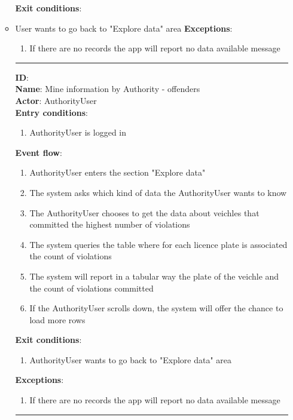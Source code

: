 \begin{enumerate}
\begin{itemize}
		\textbf{Exit conditions}:
          \item{User wants to go back to "Explore data" area}
		\textbf{Exceptions}:
    \begin{enumerate}
      \item{If there are no records the app will report no data available message}
    \end{enumerate}
		\rule{\linewidth}{0.4pt}
		\textbf{ID}:  \\
		\textbf{Name}: Mine information by Authority - offenders \\
		\textbf{Actor}: AuthorityUser   \\
		\textbf{Entry conditions}:
		\begin{enumerate}
			\item{AuthorityUser is logged in}
		\end{enumerate}
		\textbf{Event flow}:
		\begin{enumerate}
			\item{AuthorityUser enters the section "Explore data"}
			\item{The system asks which kind of data the AuthorityUser wants to know}
      \item{The AuthorityUser chooses to get the data about veichles that committed the highest number of violations}
      \item{The system queries the table where for each licence plate is associated the count of violations }
      \item{The system will report in a tabular way the plate of the veichle and the count of violations committed}
      \item{If the AuthorityUser scrolls down, the system will offer the chance to load more rows}
		\end{enumerate}
		\textbf{Exit conditions}:
    \begin{enumerate}
      \item{AuthorityUser wants to go back to "Explore data" area}
    \end{enumerate}
		\textbf{Exceptions}:
		\begin{enumerate}
			\item{If there are no records the app will report no data available message}
		\end{enumerate}
		\rule{\linewidth}{0.4pt}


\end{itemize}
\end{enumerate}

